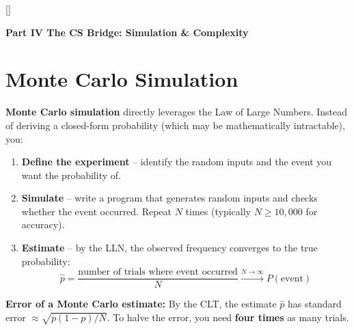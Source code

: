 \documentclass[11pt, letterpaper]{article}
\newcommand{\orangesections}{%
  \titleformat{\section}{\large\bfseries\color{sectionorange}}{}{0em}{}[\color{sectionorange}\titlerule]%
  \titleformat{\subsection}{\normalsize\bfseries\color{sectionorange!80!black}}{}{0em}{}%
}
\newcommand{\partbanner}[3]{%
  \begin{tcolorbox}[colback=#1, colframe=#2, boxrule=1.2pt, arc=4pt,
    left=8pt, right=8pt, top=6pt, bottom=6pt]
    \begin{center}{\LARGE\bfseries #3}\end{center}
  \end{tcolorbox}%
}
\begin{document}
\orangesections
{}
\partbanner{part4bg}{sectionorange}{Part IV \quad The CS Bridge: Simulation \& Complexity}

\vspace{8pt}

\section*{Monte Carlo Simulation}

\textbf{Monte Carlo simulation} directly leverages the Law of Large Numbers. Instead of deriving a closed-form probability (which may be mathematically intractable), you:

\begin{enumerate}[noitemsep]
  \item \textbf{Define the experiment} -- identify the random inputs and the event you want the probability of.
  \item \textbf{Simulate} -- write a program that generates random inputs and checks whether the event occurred. Repeat $N$ times (typically $N \geq 10{,}000$ for accuracy).
  \item \textbf{Estimate} -- by the LLN, the observed frequency converges to the true probability:
  \[
    \hat{p} = \frac{\text{number of trials where event occurred}}{N} \xrightarrow{N \to \infty} P(\text{event})
  \]
\end{enumerate}

\textbf{Error of a Monte Carlo estimate:} By the CLT, the estimate $\hat{p}$ has standard error $\approx \sqrt{p(1-p)/N}$. To halve the error, you need \textbf{four times} as many trials.
\end{document}
